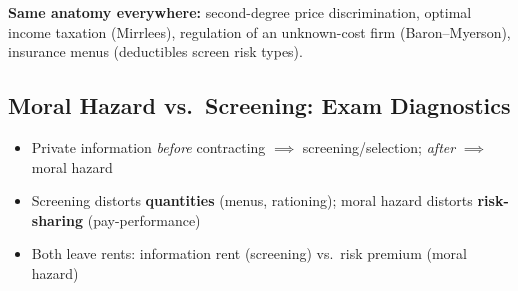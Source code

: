 \textbf{Same anatomy everywhere:} second-degree price discrimination, optimal income taxation (Mirrlees), regulation of an unknown-cost firm (Baron--Myerson), insurance menus (deductibles screen risk types).

\subsection{Moral Hazard vs.\ Screening: Exam Diagnostics}
\begin{itemize}[nosep]
    \item Private information \textit{before} contracting \(\implies\) screening/selection; \textit{after} \(\implies\) moral hazard
    \item Screening distorts \textbf{quantities} (menus, rationing); moral hazard distorts \textbf{risk-sharing} (pay-performance)
    \item Both leave rents: information rent (screening) vs.\ risk premium (moral hazard)
\end{itemize}
